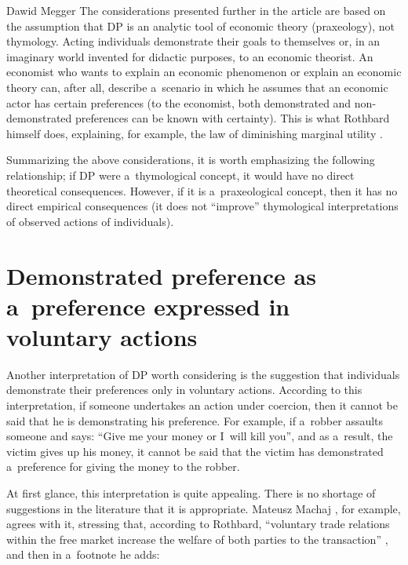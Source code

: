 \begin{artengenv}{Dawid Megger}
The considerations presented further in the article are based on the assumption that DP is an analytic tool of economic theory (praxeology), not thymology. Acting individuals demonstrate their goals to themselves or, in an imaginary world invented for didactic purposes, to an economic theorist. An economist who wants to explain an economic phenomenon or explain an economic theory can, after all, describe a~scenario in which he assumes that an economic actor has certain preferences (to the economist, both demonstrated and non-demonstrated preferences can be known with certainty). This is what Rothbard himself does, explaining, for example, the law of diminishing marginal utility 
\parencite[][pp.21–33]{rothbard_man_2009}.%




Summarizing the above considerations, it is worth emphasizing the following relationship; if DP were a~thymological concept, it would have no direct theoretical consequences. However, if it is a~praxeological concept, then it has no direct empirical consequences (it does not ``improve'' thymological interpretations of observed actions of individuals).



\section{Demonstrated preference as a~preference expressed in voluntary actions}

Another interpretation of DP worth considering is the suggestion that individuals demonstrate their preferences only in voluntary actions. According to this interpretation, if someone undertakes an action under coercion, then it cannot be said that he is demonstrating his preference. For example, if a~robber assaults someone and says: ``Give me your money or I~will kill you'', and as a~result, the victim gives up his money, it cannot be said that the victim has demonstrated a~preference for giving the money to the robber.



At first glance, this interpretation is quite appealing. There is no shortage of suggestions in the literature that it is appropriate. Mateusz Machaj 
\parencite*[][]{machaj_murray_2014}, %
 for example, agrees with it, stressing that, according to Rothbard, ``voluntary trade relations within the free market increase the welfare of both parties to the transaction'' 
\parencite[][own transl.]{machaj_murray_2014}, %
 and then in a~footnote he adds:




\end{artengenv}
